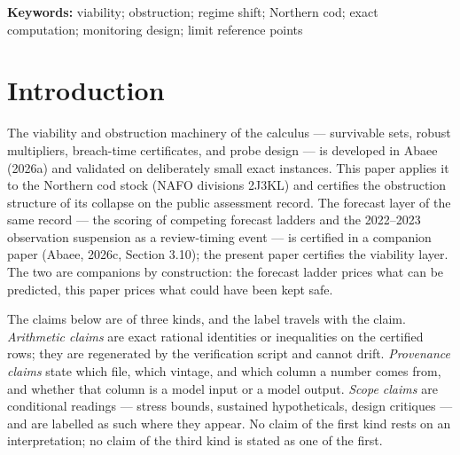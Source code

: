 \documentclass[10pt,twocolumn]{article}
\theoremstyle{plain}
\theoremstyle{remark}
\begin{document}
\begin{abstract}
collapse-era steps 1991--1995 certify as declines and the 1993 floor
breach holds at the band's upper edge (\(115 < 276\)), while no
reference-decade step certifies; the reference decade's window profile
shows every subwindow of horizon four or more growing (the sustained-decline
reading holds only at horizons one to three); and the vintage's own
1954--1982 record has the window opening at \(28.3\%\) of the 1962 peak,
three years after a prior floor episode (1977--1979). The collapse is present in the raw survey index (a certified
factor of \(\tfrac{21797}{2127417}\) over 1989--1994, falling \(2.6\)
times further than the assessment series over their common window);
the forage-fish covariate collapses in the same annual step in which
the mortality diagnostic crosses \(M=1\), two steps before the floor
breach; and both assessment vintages re-cross the floor at the 2015
reading, with outcome years at most
\(\tfrac{44000}{88460} \approx 49.7\%\) of the reference point. Every
quantity is regenerated by an accompanying verification script in
exact rational arithmetic.
\end{abstract}

\textbf{Keywords:} viability; obstruction; regime shift; Northern cod;
exact computation; monitoring design; limit reference points

\section{Introduction}\label{intro}

The viability and obstruction machinery of the calculus --- survivable
sets, robust multipliers, breach-time certificates, and probe design ---
is developed in Abaee (2026a) and validated on deliberately small exact
instances. This paper applies it to the Northern cod stock (NAFO
divisions 2J3KL) and certifies the obstruction structure of its
collapse on the public assessment record. The forecast layer of the
same record --- the scoring of competing forecast ladders and the
2022--2023 observation suspension as a review-timing event --- is
certified in a companion paper (Abaee, 2026c, Section 3.10); the
present paper certifies the viability layer. The two are companions by
construction: the forecast ladder prices what can be predicted, this
paper prices what could have been kept safe.

The claims below are of three kinds, and the label travels with the
claim. \emph{Arithmetic claims} are exact rational identities or
inequalities on the certified rows; they are regenerated by the
verification script and cannot drift. \emph{Provenance claims} state
which file, which vintage, and which column a number comes from, and
whether that column is a model input or a model output. \emph{Scope
claims} are conditional readings --- stress bounds, sustained
hypotheticals, design critiques --- and are labelled as such where
they appear. No claim of the first kind rests on an interpretation; no
claim of the third kind is stated as one of the first.
\end{document}
